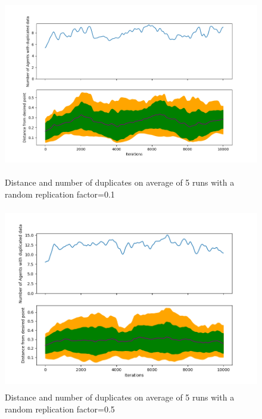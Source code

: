 \documentclass{UoYCSproject}
\begin{document}
\begin{figure}[htb]
\label{fig:Data3}
\begin{center}
\centering
\includegraphics[width=\linewidth, height=8cm]{"./PrelimData/SimpleSuicideReplication_n50_r0.5_c1_m4_repchance0.1_avg5.png"}
\caption{Distance and number of duplicates on average of 5 runs with a random replication factor=0.1}
\end{center}
\end{figure}

\begin{figure}[htb]
\label{fig:Data4}
\begin{center}
\centering
\includegraphics[width=\linewidth, height=8cm]{"./PrelimData/SimpleSuicideReplication_n50_r0.5_c1_m4_repchance0.5_avg5.png"}
\caption{Distance and number of duplicates on average of 5 runs with a random replication factor=0.5}
\end{center}
\end{figure}
\end{document}
